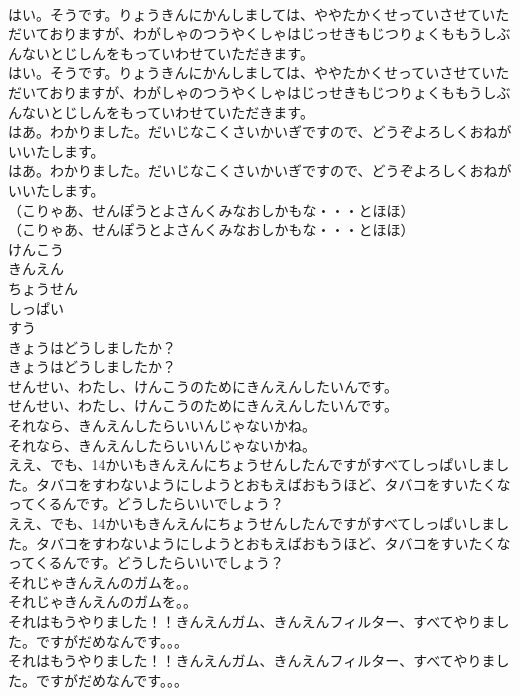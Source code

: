 \documentclass[8pt]{extreport}
\begin{document}
\begin{CJK}{UTF8}{min}
\\	はい。そうです。りょうきんにかんしましては、ややたかくせっていさせていただいておりますが、わがしゃのつうやくしゃはじっせきもじつりょくももうしぶんないとじしんをもっていわせていただきます。	
\\	はい。そうです。りょうきんにかんしましては、ややたかくせっていさせていただいておりますが、わがしゃのつうやくしゃはじっせきもじつりょくももうしぶんないとじしんをもっていわせていただきます。 
\\	はあ。わかりました。だいじなこくさいかいぎですので、どうぞよろしくおねがいいたします。	
\\	はあ。わかりました。だいじなこくさいかいぎですので、どうぞよろしくおねがいいたします。 
\\	（こりゃあ、せんぽうとよさんくみなおしかもな・・・とほほ）	
\\	（こりゃあ、せんぽうとよさんくみなおしかもな・・・とほほ） 
\\	けんこう
\\	きんえん
\\	ちょうせん
\\	しっぱい
\\	すう
\\	きょうはどうしましたか？	
\\	きょうはどうしましたか？ 
\\	せんせい、わたし、けんこうのためにきんえんしたいんです。	
\\	せんせい、わたし、けんこうのためにきんえんしたいんです。 
\\	それなら、きんえんしたらいいんじゃないかね。	
\\	それなら、きんえんしたらいいんじゃないかね。 
\\	ええ、でも、14かいもきんえんにちょうせんしたんですがすべてしっぱいしました。タバコをすわないようにしようとおもえばおもうほど、タバコをすいたくなってくるんです。どうしたらいいでしょう？	
\\	ええ、でも、14かいもきんえんにちょうせんしたんですがすべてしっぱいしました。タバコをすわないようにしようとおもえばおもうほど、タバコをすいたくなってくるんです。どうしたらいいでしょう？ 
\\	それじゃきんえんのガムを。。	
\\	それじゃきんえんのガムを。。 
\\	それはもうやりました！！きんえんガム、きんえんフィルター、すべてやりました。ですがだめなんです。。。	
\\	それはもうやりました！！きんえんガム、きんえんフィルター、すべてやりました。ですがだめなんです。。。 

\end{CJK}
\end{document}
